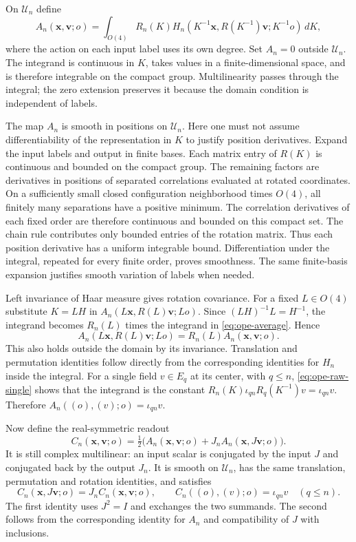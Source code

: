On $\mathcal U_n$ define
\begin{equation}\label{eq:ope-average}
 A_n(\boldsymbol x,\boldsymbol v;o)
   =\int_{O(4)}R_n(K)
       H_n(K^{-1}\boldsymbol x,R(K^{-1})\boldsymbol v;K^{-1}o)\,dK,
\end{equation}
where the action on each input label uses its own degree. Set $A_n=0$
outside $\mathcal U_n$. The integrand is continuous in $K$, takes values
in a finite-dimensional space, and is therefore integrable on the compact
group. Multilinearity passes through the integral; the zero extension
preserves it because the domain condition is independent of labels.

The map $A_n$ is smooth in positions on $\mathcal U_n$. Here one must not
assume differentiability of the representation in $K$ to justify
position derivatives. Expand the input labels and output in finite bases.
Each matrix entry of $R(K)$ is continuous and bounded on the compact
group. The remaining factors are derivatives in positions of separated
correlations evaluated at rotated coordinates. On a sufficiently small
closed configuration neighborhood times $O(4)$, all finitely many
separations have a positive minimum. The correlation derivatives of each
fixed order are therefore continuous and bounded on this compact set.
The chain rule contributes only bounded entries of the rotation matrix.
Thus each position derivative has a uniform integrable bound.
Differentiation under the integral, repeated for every finite order,
proves smoothness. The same finite-basis expansion justifies smooth
variation of labels when needed.

Left invariance of Haar measure gives rotation covariance. For a fixed
$L\in O(4)$ substitute $K=LH$ in
$A_n(L\boldsymbol x,R(L)\boldsymbol v;Lo)$. Since
$(LH)^{-1}L=H^{-1}$, the integrand becomes $R_n(L)$ times the integrand
in \eqref{eq:ope-average}. Hence
\[
 A_n(L\boldsymbol x,R(L)\boldsymbol v;Lo)
                         =R_n(L)A_n(\boldsymbol x,\boldsymbol v;o).
\]
This also holds outside the domain by its invariance. Translation and
permutation identities follow directly from the corresponding identities
for $H_n$ inside the integral. For a single field $v\in E_q$ at its
center, with $q\leq n$, \eqref{eq:ope-raw-single} shows that the integrand
is the constant
$R_n(K)\iota_{qn}R_q(K^{-1})v=\iota_{qn}v$. Therefore
$A_n((o),(v);o)=\iota_{qn}v$.

Now define the real-symmetric readout
\begin{equation}\label{eq:ope-real-average}
 C_n(\boldsymbol x,\boldsymbol v;o)
  =\tfrac12\bigl(A_n(\boldsymbol x,\boldsymbol v;o)
       +J_nA_n(\boldsymbol x,J\boldsymbol v;o)\bigr).
\end{equation}
It is still complex multilinear: an input scalar is conjugated by the
input $J$ and conjugated back by the output $J_n$. It is smooth on
$\mathcal U_n$, has the same translation, permutation and rotation
identities, and satisfies
\[
 C_n(\boldsymbol x,J\boldsymbol v;o)=J_nC_n(\boldsymbol x,\boldsymbol v;o),
 \qquad C_n((o),(v);o)=\iota_{qn}v\quad(q\leq n).
\]
The first identity uses $J^2=I$ and exchanges the two summands. The
second follows from the corresponding identity for $A_n$ and
compatibility of $J$ with inclusions.

